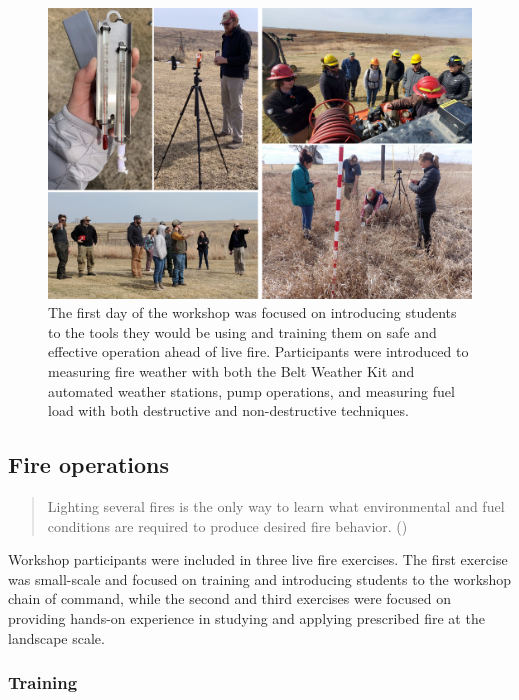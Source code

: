 \documentclass[fire,article,submit,moreauthors,pdftex]{Definitions/mdpi}
\begin{document}
\begin{figure}
\centering
\includegraphics[width=1\columnwidth]{TrainingDay.pdf}
\caption{The first day of the workshop was focused on introducing students to the tools they would be using and training them on safe and effective operation ahead of live fire. Participants were introduced to measuring fire weather with both the Belt Weather Kit and automated weather stations, pump operations, and measuring fuel load with both destructive and non-destructive techniques.}\label{TrainingDay}
\end{figure}

\subsection{Fire operations}

\begin{quote}
Lighting several fires is the only way to learn what environmental and fuel conditions are required to produce desired fire behavior. (\citet{mcpherson1986})
\end{quote}

Workshop participants were included in three live fire exercises.
The first exercise was small-scale and focused on training and introducing students to the workshop chain of command, while the second and third exercises were focused on providing hands-on experience in studying and applying prescribed fire at the landscape scale.

\subsubsection{Training}
\end{document}
